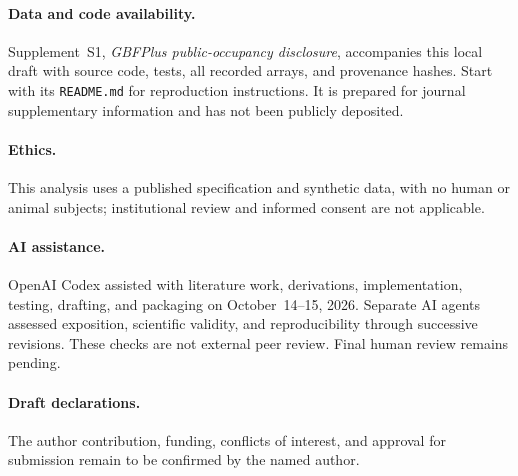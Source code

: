 \paragraph{Data and code availability.}
Supplement~S1, \emph{GBFPlus public-occupancy disclosure}, accompanies this local
draft with source code, tests, all recorded arrays, and provenance hashes.
Start with its \texttt{README.md} for reproduction instructions. It is prepared for
journal supplementary information and has not been publicly deposited.

\paragraph{Ethics.}
This analysis uses a published specification and synthetic data, with no human
or animal subjects; institutional review and informed consent are not applicable.

\paragraph{AI assistance.}
OpenAI Codex assisted with literature work, derivations, implementation, testing,
drafting, and packaging on October~14--15, 2026. Separate AI agents assessed
exposition, scientific validity, and reproducibility through successive revisions.
These checks are not external peer review. Final human review remains pending.

\paragraph{Draft declarations.}
The author contribution, funding, conflicts of interest, and approval for
submission remain to be confirmed by the named author.
